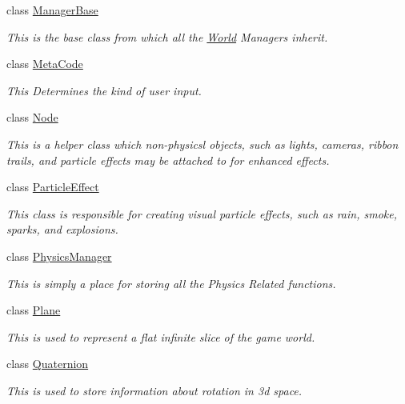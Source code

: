 \begin{DoxyCompactItemize}
class \hyperlink{classphys_1_1ManagerBase}{ManagerBase}
\begin{DoxyCompactList}\small\item\em This is the base class from which all the \hyperlink{classphys_1_1World}{World} Managers inherit. \item\end{DoxyCompactList}\item 
class \hyperlink{classphys_1_1MetaCode}{MetaCode}
\begin{DoxyCompactList}\small\item\em This Determines the kind of user input. \item\end{DoxyCompactList}\item 
class \hyperlink{classphys_1_1Node}{Node}
\begin{DoxyCompactList}\small\item\em This is a helper class which non-\/physicsl objects, such as lights, cameras, ribbon trails, and particle effects may be attached to for enhanced effects. \item\end{DoxyCompactList}\item 
class \hyperlink{classphys_1_1ParticleEffect}{ParticleEffect}
\begin{DoxyCompactList}\small\item\em This class is responsible for creating visual particle effects, such as rain, smoke, sparks, and explosions. \item\end{DoxyCompactList}\item 
class \hyperlink{classphys_1_1PhysicsManager}{PhysicsManager}
\begin{DoxyCompactList}\small\item\em This is simply a place for storing all the Physics Related functions. \item\end{DoxyCompactList}\item 
class \hyperlink{classphys_1_1Plane}{Plane}
\begin{DoxyCompactList}\small\item\em This is used to represent a flat infinite slice of the game world. \item\end{DoxyCompactList}\item 
class \hyperlink{classphys_1_1Quaternion}{Quaternion}
\begin{DoxyCompactList}\small\item\em This is used to store information about rotation in 3d space. \item\end{DoxyCompactList}\item 

\end{DoxyCompactItemize}
